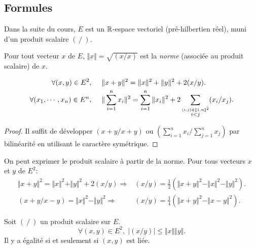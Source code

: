 \subsection{Formules}
Dans la suite du cours, $E$ est un $\mathbb{R}$-espace vectoriel (pré-hilbertien réel), muni d'un produit scalaire $(~/~)$.
\begin{nota}
Pour tout vecteur $x$ de $E$, $ \Vert x \Vert  = \sqrt{ (x/x) }$ est la \emph{norme} (associée au produit scalaire) de $x$.
\end{nota}
\begin{prop}
\begin{align*}
\forall (x,y) \in E^2,\hspace{0.5cm}     &\Vert x+y \Vert ^2 =  \Vert x \Vert ^2 +  \Vert y \Vert ^2 + 2(x/y). \\
\forall (x_1,\cdots,x_n)\in E^n,\hspace{0.5cm} &\Vert \sum_{i=1}^n x_i \Vert^2 = \sum_{i=1}^n \Vert x_i \Vert^2 + 2 \sum_{\stackrel{(i,j)\in\llbracket 1,n \rrbracket^2}{i < j}}(x_i / x_j).
\end{align*}
\end{prop}
\begin{proof}
Il suffit de développer $(x+y/x+y)$ ou $(\sum_{i=1}^n x_i/ \sum_{j=1}^n x_j)$ par bilinéarité en utilisant le caractère symétrique.
\end{proof}
\begin{prop}
On peut exprimer le produit scalaire à partir de la norme. Pour tous vecteurs $x$ et $y$ de $E^2$:
\begin{align*}
 \Vert x+ y\Vert^2 = \Vert x \Vert ^2 + \Vert y \Vert^2 + 2 (x/y) \Rightarrow& 
 (x/y) = \frac{1}{2} \left(  \Vert x+y \Vert ^2 -  \Vert x \Vert ^2 -  \Vert y \Vert ^2 \right).\\
 (x+y/x-y) = \Vert x \Vert^2 - \Vert y \Vert^2 \Rightarrow& (x/y)= \frac{1}{4} \left(  \Vert x+y \Vert ^2 -  \Vert x-y \Vert ^2 \right). 
\end{align*}
\end{prop}
\begin{prop}
Soit $(~/~)$ un produit scalaire sur $E$.
\begin{displaymath}
\forall(x,y) \in E^2,\;| (x/y) | \leq  \Vert  x  \Vert   \Vert  y  \Vert .
\end{displaymath}
Il y a égalité si et seulement si $(x,y)$ est liée.
\end{prop}
